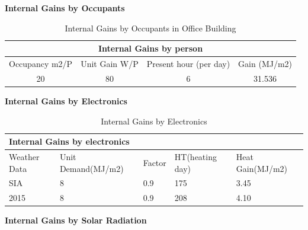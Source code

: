 \documentclass[a4paper, oneside]{discothesis}
\begin{document}
		\textbf{Internal Gains by Occupants}\\ 
\begin{table}[H]
  \centering
\caption{Internal Gains by Occupants in Office Building}
    \begin{tabular}{cccc}
    \toprule
    \multicolumn{4}{c}{Internal Gains by person} \\
    \midrule
    \multicolumn{1}{c}{Occupancy m2/P} & \multicolumn{1}{c}{Unit Gain W/P} & \multicolumn{1}{c}{Present hour (per day)} & \multicolumn{1}{c}{Gain (MJ/m2)} \\
    \midrule
    20   & 80   & 6    & 31.536 \\
    \bottomrule
    \end{tabular}%
  \label{tab:SumatraPersonGain}%
\end{table}%


		\textbf{Internal Gains by Electronics}\\
		\begin{table}[H]
		\centering
		\caption{Internal Gains by Electronics}
		    \begin{tabular}{lllll}
		    \toprule
		    \multicolumn{5}{p{30.135em}}{Internal Gains by electronics} \\
		    \midrule
		    \multicolumn{1}{p{5.215em}}{Weather Data} & \multicolumn{1}{p{6.355em}}{Unit Demand\newline{}(MJ/m2)} & \multicolumn{1}{p{5.855em}}{Factor} & \multicolumn{1}{p{6.355em}}{HT\newline{}(heating day)} & \multicolumn{1}{p{6.355em}}{Heat Gain\newline{}(MJ/m2)} \\
		    \midrule
		    \multicolumn{1}{p{5.215em}}{SIA} & 8    & 0.9  & 175  & 3.45 \\
		    2015 & 8    & 0.9  & 208  & 4.10 \\
		    \bottomrule
		    \end{tabular}%
		  \label{tab:SumatraElecGains}%
		\end{table}%



		\textbf{Internal Gains by Solar Radiation}\\
\end{document}
